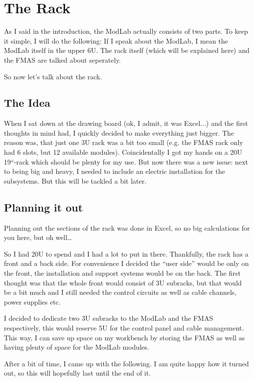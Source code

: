 \chapter{The Rack}
As I said in the introduction, the ModLab actually consists of two parts. To keep it simple, I will do the following: If I speak about the ModLab, I mean the ModLab itself in the upper 6U. The rack itself (which will be explained here) and the FMAS are talked about seperately. 

So now let's talk about the rack.

\section{The Idea}
When I sat down at the drawing board (ok, I admit, it was Excel...) and the first thoughts in mind had, I quickly decided to make everything just bigger. The reason was, that just one 3U rack was a bit too small (e.g. the FMAS rack only had 6 slots, but 12 available modules). Coincidentally I got my hands on a 20U 19``-rack which should be plenty for my use. But now there was a new issue: next to being big and heavy, I needed to include an electric installation for the subsystems. But this will be tackled a bit later.

\section{Planning it out}
Planning out the sections of the rack was done in Excel, so no big calculations for you here, but oh well\dots

So I had 20U to spend and I had a lot to put in there. Thankfully, the rack has a front and a back side. For convenience I decided the ``user side'' would be only on the front, the installation and support systems would be on the back. The first thought was that the whole front would consist of 3U subracks, but that would be a bit much and I still needed the control circuits as well as cable channels, power supplies etc. 

I decided to dedicate two 3U subracks to the ModLab and the FMAS respectively, this would reserve 5U for the control panel and cable management. This way, I can save up space on my workbench by storing the FMAS as well as having plenty of space for the ModLab modules.

After a bit of time, I came up with the following. I am quite happy how it turned out, so this will hopefully last until the end of it.

